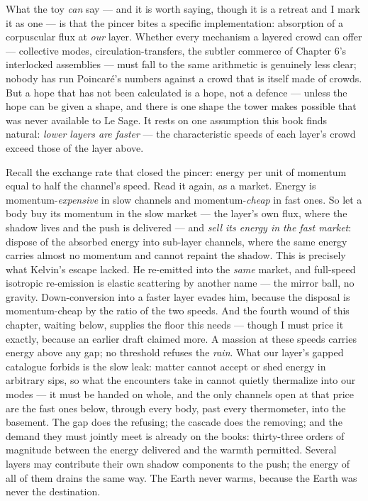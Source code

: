 \documentclass[fontsize=11pt,paper=a4,pagesize=auto,parskip=half-]{scrbook}
\begin{document}
What the toy \emph{can} say --- and it is worth saying, though it is a retreat and I mark it as one --- is that the pincer bites a specific implementation: absorption of a corpuscular flux at \emph{our} layer. Whether every mechanism a layered crowd can offer --- collective modes, circulation-transfers, the subtler commerce of Chapter 6's interlocked assemblies --- must fall to the same arithmetic is genuinely less clear; nobody has run Poincaré's numbers against a crowd that is itself made of crowds. But a hope that has not been calculated is a hope, not a defence --- unless the hope can be given a shape, and there is one shape the tower makes possible that was never available to Le Sage. It rests on one assumption this book finds natural: \emph{lower layers are faster} --- the characteristic speeds of each layer's crowd exceed those of the layer above.

Recall the exchange rate that closed the pincer: energy per unit of momentum equal to half the channel's speed. Read it again, as a market. Energy is momentum-\emph{expensive} in slow channels and momentum-\emph{cheap} in fast ones. So let a body buy its momentum in the slow market --- the layer's own flux, where the shadow lives and the push is delivered --- and \emph{sell its energy in the fast market}: dispose of the absorbed energy into sub-layer channels, where the same energy carries almost no momentum and cannot repaint the shadow. This is precisely what Kelvin's escape lacked. He re-emitted into the \emph{same} market, and full-speed isotropic re-emission is elastic scattering by another name --- the mirror ball, no gravity. Down-conversion into a faster layer evades him, because the disposal is momentum-cheap by the ratio of the two speeds. And the fourth wound of this chapter, waiting below, supplies the floor this needs --- though I must price it exactly, because an earlier draft claimed more. A massion at these speeds carries energy above any gap; no threshold refuses the \emph{rain}. What our layer's gapped catalogue forbids is the slow leak: matter cannot accept or shed energy in arbitrary sips, so what the encounters take in cannot quietly thermalize into our modes --- it must be handed on whole, and the only channels open at that price are the fast ones below, through every body, past every thermometer, into the basement. The gap does the refusing; the cascade does the removing; and the demand they must jointly meet is already on the books: thirty-three orders of magnitude between the energy delivered and the warmth permitted. Several layers may contribute their own shadow components to the push; the energy of all of them drains the same way. The Earth never warms, because the Earth was never the destination.
\end{document}
